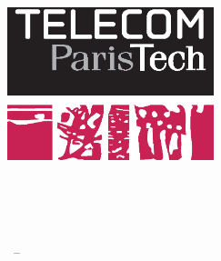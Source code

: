 \begin{titlepage}
    \begin{addmargin}[-1cm]{-3cm}
    \begin{center}
        \large  

        \hfill

        \vfill

        \begingroup
            \color{Maroon}\spacedallcaps{\myTitle} \\ \medskip 
            \mySubtitle \\ \bigskip
        \endgroup
  		

        \spacedlowsmallcaps{\myName}     

        \vfill

        \includegraphics[width=6cm]{gfx/telecom.eps} \\ \medskip

          
        \myFaculty \\
        \myUni \\ 
        \myLocation \\ \bigskip

        \myTime\ -- \myVersion

        \vfill                      

    \end{center}  
  \end{addmargin}       
\end{titlepage}   
